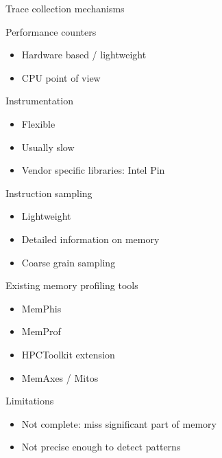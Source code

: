 \documentclass[xcolor={usenames,dvipsnames},hyperref={pdfusetitle}]{beamer}
\begin{document}
\begin{frame}{Trace collection mechanisms}
    \begin{block}{Performance counters}
        \begin{itemize}
            \item Hardware based / lightweight
            \item CPU point of view
        \end{itemize}
    \end{block}
    \pause
    \begin{block}{Instrumentation}
        \begin{itemize}
            \item Flexible
            \item Usually slow
            \item Vendor specific libraries: Intel Pin~\cite{Luk05Pin}
        \end{itemize}
    \end{block}
    \pause
    \begin{alertblock}{Instruction sampling~\cite{Drongowski07Instructionbased,Levinthal09Performance}}
        \begin{itemize}
            \item Lightweight
            \item Detailed information on memory
            \item Coarse grain sampling
        \end{itemize}
    \end{alertblock}
\end{frame}

\begin{frame}{Existing memory profiling tools}
    \begin{block}{}
        \begin{itemize}
            \item  MemPhis~\cite{McCurdy10Memphis}
            \item<alert@1->  MemProf~\cite{Lachaize12MemProf}
            \item  HPCToolkit extension~\cite{Liu14Tool}
            \item <alert@1-> MemAxes / Mitos~\cite{Gimenez14Dissecting}
        \end{itemize}
    \end{block}
    \pause
    \begin{alertblock}{Limitations}
        \begin{itemize}
            \item Not complete: miss significant part of memory
            \item Not precise enough to detect patterns
        \end{itemize}
    \end{alertblock}
\end{frame}
\end{document}
